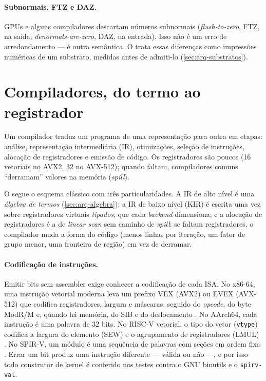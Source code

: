 \paragraph{Subnormais, FTZ e DAZ.} GPUs e alguns compiladores descartam números subnormais (\textit{flush-to-zero}, FTZ, na saída; \textit{denormals-are-zero}, DAZ, na entrada). Isso não é um erro de arredondamento --- é outra semântica. O \vapor{} trata essas diferenças como impressões numéricas de um substrato, medidas antes de admiti-lo (\autoref{sec:arq-substratos}).

\section{Compiladores, do termo ao registrador}\label{sec:compiladores}

\begin{graduacao}
Um compilador traduz um programa de uma representação para outra em etapas: análise, representação intermediária (IR), otimizações, seleção de instruções, alocação de registradores e emissão de código. Os registradores são poucos (16 vetoriais no AVX2, 32 no AVX-512); quando faltam, compiladores comuns ``derramam'' valores na memória (\textit{spill}).
\end{graduacao}

O \vapor{} segue o esquema clássico com três particularidades. A IR de alto nível é uma \emph{álgebra de termos} (\autoref{sec:arq-algebra}); a IR de baixo nível (KIR) é escrita uma vez sobre registradores virtuais \emph{tipados}, que cada \textit{backend} dimensiona; e a alocação de registradores é a de \emph{linear scan} \cite{poletto1999} sem caminho de \textit{spill}: se faltam registradores, o compilador muda a forma do código (menos linhas por iteração, um fator de grupo menor, uma fronteira de região) em vez de derramar.

\paragraph{Codificação de instruções.} Emitir bits sem assembler exige conhecer a codificação de cada ISA. No x86-64, uma instrução vetorial moderna leva um prefixo VEX (AVX2) ou EVEX (AVX-512) que codifica registradores, largura e máscaras, seguido do \textit{opcode}, do byte ModR/M e, quando há memória, do SIB e do deslocamento \cite{intelsdm}. No AArch64, cada instrução é uma palavra de 32 bits. No RISC-V vetorial, o tipo do vetor (\texttt{vtype}) codifica a largura do elemento (SEW) e o agrupamento de registradores (LMUL) \cite{rvv10}. No SPIR-V, um módulo é uma sequência de palavras com seções em ordem fixa \cite{spirv}. Errar um bit produz uma instrução diferente --- válida ou não ---, e por isso todo construtor de kernel é conferido nos testes contra o GNU binutils e o \texttt{spirv-val}.

